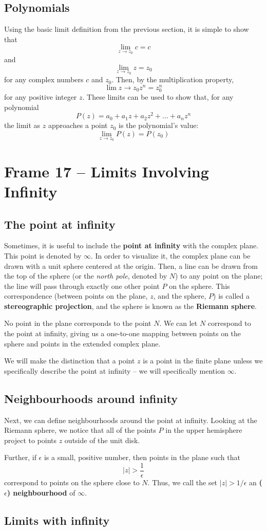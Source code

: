\documentclass{article}
\renewcommand{\emph}{\textbf}
\begin{document}
\subsection{Polynomials}
Using the basic limit definition from the previous section, it is simple to show that
\[
	\lim_{z \to z_0} c = c
\]
and
\[
	\lim_{z \to z_0} z = z_0
\]
for any complex numbers $c$ and $z_0$. Then, by the multiplication property,
\[
	\lim{z \to z_0} z^n = z_0^n
\]
for any positive integer $z$. These limits can be used to show that, for any polynomial
\[
	P(z) = a_0 + a_1 z + a_2 z^2 + \dots + a_n z^n
\]
the limit as $z$ approaches a point $z_0$ is the polynomial's value:
\[
	\lim_{z \to z_0} P(z) = P(z_0)
\]


\clearpage
\section{Frame 17 -- Limits Involving Infinity}
\subsection{The point at infinity}
Sometimes, it is useful to include the \emph{point at infinity} with the complex plane. This point is denoted by $\infty$. In order to visualize it, the complex plane can be drawn with a unit sphere centered at the origin. Then, a line can be drawn from the top of the sphere (or the \textit{north pole}, denoted by $N$) to any point on the plane; the line will pass through exactly one other point $P$ on the sphere. This correspondence (between points on the plane, $z$, and the sphere, $P$) is called a \emph{stereographic projection}, and the sphere is known as the \emph{Riemann sphere}.

No point in the plane corresponds to the point $N$. We can let $N$ correspond to the point at infinity, giving us a one-to-one mapping between points on the sphere and points in the extended complex plane. 

We will make the distinction that a point $z$ is a point in the finite plane unless we specifically describe the point at infinity -- we will specifically mention $\infty$.

\subsection{Neighbourhoods around infinity}
Next, we can define neighbourhoods around the point at infinity. Looking at the Riemann sphere, we notice that all of the points $P$ in the upper hemisphere project to points $z$ outside of the unit disk. 

Further, if $\epsilon$ is a small, positive number, then points in the plane such that
\[
	|z| > \frac{1}{\epsilon}
\]
correspond to points on the sphere close to $N$. Thus, we call the set $|z| > 1/\epsilon$ an \emph{($\epsilon$) neighbourhood} of $\infty$.

\subsection{Limits with infinity}
\end{document}
